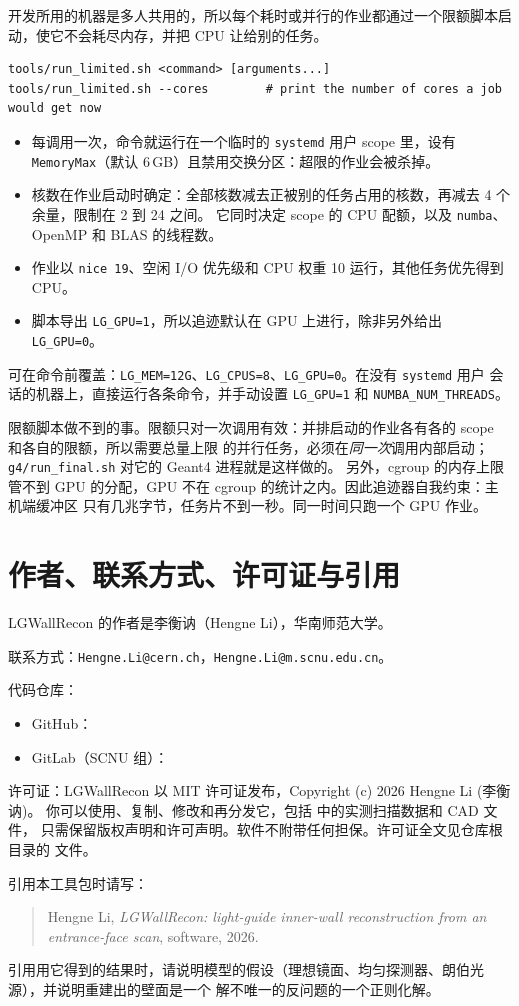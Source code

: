 \documentclass[11pt,a4paper,fontset=fandol]{ctexart}
\newcommand{\code}[1]{\texttt{#1}}
\begin{document}
开发所用的机器是多人共用的，所以每个耗时或并行的作业都通过一个限额脚本启动，使它不会耗尽内存，并把 CPU
让给别的任务。
\begin{lstlisting}
tools/run_limited.sh <command> [arguments...]
tools/run_limited.sh --cores        # print the number of cores a job would get now
\end{lstlisting}
\begin{itemize}
\item 每调用一次，命令就运行在一个临时的 \code{systemd} 用户 scope 里，设有 \code{MemoryMax}（默认
6\,GB）且禁用交换分区：超限的作业会被杀掉。
\item 核数在作业启动时确定：全部核数减去正被别的任务占用的核数，再减去 4 个余量，限制在 2 到 24 之间。
它同时决定 scope 的 CPU 配额，以及 \code{numba}、OpenMP 和 BLAS 的线程数。
\item 作业以 \code{nice 19}、空闲 I/O 优先级和 CPU 权重 10 运行，其他任务优先得到 CPU。
\item 脚本导出 \code{LG\_GPU=1}，所以追迹默认在 GPU 上进行，除非另外给出 \code{LG\_GPU=0}。
\end{itemize}
可在命令前覆盖：\code{LG\_MEM=12G}、\code{LG\_CPUS=8}、\code{LG\_GPU=0}。在没有 \code{systemd} 用户
会话的机器上，直接运行各条命令，并手动设置 \code{LG\_GPU=1} 和 \code{NUMBA\_NUM\_THREADS}。

限额脚本做不到的事。限额只对一次调用有效：并排启动的作业各有各的 scope 和各自的限额，所以需要总量上限
的并行任务，必须在\emph{同一次}调用内部启动；\code{g4/run\_final.sh} 对它的 Geant4 进程就是这样做的。
另外，cgroup 的内存上限管不到 GPU 的分配，GPU 不在 cgroup 的统计之内。因此追迹器自我约束：主机端缓冲区
只有几兆字节，任务片不到一秒。同一时间只跑一个 GPU 作业。

\section{作者、联系方式、许可证与引用}

LGWallRecon 的作者是李衡讷（Hengne Li），华南师范大学。

联系方式：\code{Hengne.Li@cern.ch}，\code{Hengne.Li@m.scnu.edu.cn}。

代码仓库：
\begin{itemize}
\item GitHub：\GithubURL
\item GitLab（SCNU 组）：\GitlabURL
\end{itemize}

许可证：LGWallRecon 以 MIT 许可证发布，Copyright (c) 2026 Hengne Li (李衡讷)。
你可以使用、复制、修改和再分发它，包括  中的实测扫描数据和 CAD 文件，
只需保留版权声明和许可声明。软件不附带任何担保。许可证全文见仓库根目录的  文件。

引用本工具包时请写：
\begin{quote}
Hengne Li, \emph{LGWallRecon: light-guide inner-wall reconstruction from an entrance-face scan},
software, 2026.\\
\GithubURL
\end{quote}

引用用它得到的结果时，请说明模型的假设（理想镜面、均匀探测器、朗伯光源），并说明重建出的壁面是一个
解不唯一的反问题的一个正则化解。
\end{document}
